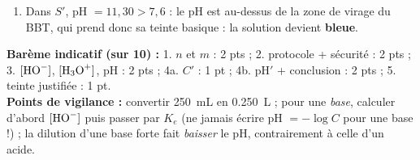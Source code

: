 \documentclass[11pt]{article}
\begin{document}
\begin{corrige}
\begin{enumerate}
\item Dans $S'$, pH $= 11{,}30 > 7{,}6$ : le pH est au-dessus de la zone de virage du BBT, qui prend donc sa teinte basique : la solution devient \textbf{bleue}.
\end{enumerate}
\textbf{Barème indicatif (sur 10) :} 1. $n$ et $m$ : 2 pts ; 2. protocole + sécurité : 2 pts ; 3. $[\ce{HO-}]$, $[\ce{H3O+}]$, pH : 2 pts ; 4a. $C'$ : 1 pt ; 4b. pH$'$ + conclusion : 2 pts ; 5. teinte justifiée : 1 pt.\\
\textbf{Points de vigilance :} convertir \SI{250}{mL} en \SI{0,250}{L} ; pour une \emph{base}, calculer d'abord $[\ce{HO-}]$ puis passer par $K_e$ (ne jamais écrire pH $= -\log C$ pour une base !) ; la dilution d'une base forte fait \emph{baisser} le pH, contrairement à celle d'un acide.
\end{corrige}
\end{document}
